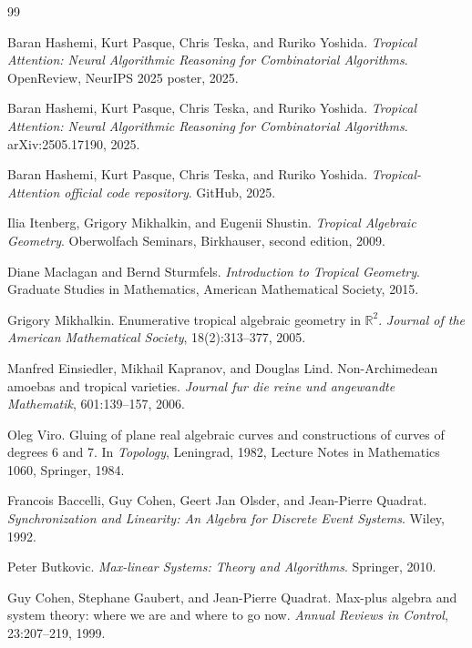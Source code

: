 \documentclass[11pt]{article}
\theoremstyle{definition}
\theoremstyle{remark}
\numberwithin{equation}{section}
\begin{document}
\begin{thebibliography}{99}

Baran Hashemi, Kurt Pasque, Chris Teska, and Ruriko Yoshida.
\newblock \emph{Tropical Attention: Neural Algorithmic Reasoning for Combinatorial Algorithms}.
\newblock OpenReview, NeurIPS 2025 poster, 2025.

Baran Hashemi, Kurt Pasque, Chris Teska, and Ruriko Yoshida.
\newblock \emph{Tropical Attention: Neural Algorithmic Reasoning for Combinatorial Algorithms}.
\newblock arXiv:2505.17190, 2025.

Baran Hashemi, Kurt Pasque, Chris Teska, and Ruriko Yoshida.
\newblock \emph{Tropical-Attention official code repository}.
\newblock GitHub, 2025.

Ilia Itenberg, Grigory Mikhalkin, and Eugenii Shustin.
\newblock \emph{Tropical Algebraic Geometry}.
\newblock Oberwolfach Seminars, Birkhauser, second edition, 2009.

Diane Maclagan and Bernd Sturmfels.
\newblock \emph{Introduction to Tropical Geometry}.
\newblock Graduate Studies in Mathematics, American Mathematical Society, 2015.

Grigory Mikhalkin.
\newblock Enumerative tropical algebraic geometry in \(\mathbb R^2\).
\newblock \emph{Journal of the American Mathematical Society}, 18(2):313--377, 2005.

Manfred Einsiedler, Mikhail Kapranov, and Douglas Lind.
\newblock Non-Archimedean amoebas and tropical varieties.
\newblock \emph{Journal fur die reine und angewandte Mathematik}, 601:139--157, 2006.

Oleg Viro.
\newblock Gluing of plane real algebraic curves and constructions of curves of degrees 6 and 7.
\newblock In \emph{Topology}, Leningrad, 1982, Lecture Notes in Mathematics 1060, Springer, 1984.

Francois Baccelli, Guy Cohen, Geert Jan Olsder, and Jean-Pierre Quadrat.
\newblock \emph{Synchronization and Linearity: An Algebra for Discrete Event Systems}.
\newblock Wiley, 1992.

Peter Butkovic.
\newblock \emph{Max-linear Systems: Theory and Algorithms}.
\newblock Springer, 2010.

Guy Cohen, Stephane Gaubert, and Jean-Pierre Quadrat.
\newblock Max-plus algebra and system theory: where we are and where to go now.
\newblock \emph{Annual Reviews in Control}, 23:207--219, 1999.


\end{thebibliography}
\end{document}
